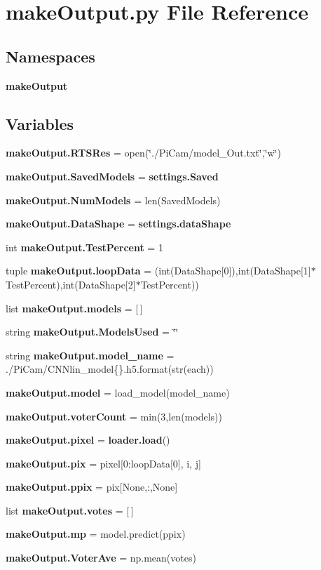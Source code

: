 \section{make\+Output.\+py File Reference}
\label{make_output_8py}
\subsection*{Namespaces}
\begin{DoxyCompactItemize}
\item 
 \textbf{ make\+Output}
\end{DoxyCompactItemize}
\subsection*{Variables}
\begin{DoxyCompactItemize}
\item 
\textbf{ make\+Output.\+R\+T\+S\+Res} = open(\char`\"{}./Pi\+Cam/model\+\_\+\+Out.\+txt\char`\"{},\char`\"{}w\char`\"{})
\item 
\textbf{ make\+Output.\+Saved\+Models} = \textbf{ settings.\+Saved}
\item 
\textbf{ make\+Output.\+Num\+Models} = len(Saved\+Models)
\item 
\textbf{ make\+Output.\+Data\+Shape} = \textbf{ settings.\+data\+Shape}
\item 
int \textbf{ make\+Output.\+Test\+Percent} = 1
\item 
tuple \textbf{ make\+Output.\+loop\+Data} = (int(Data\+Shape[0]),int(Data\+Shape[1]$\ast$Test\+Percent),int(Data\+Shape[2]$\ast$Test\+Percent))
\item 
list \textbf{ make\+Output.\+models} = [$\,$]
\item 
string \textbf{ make\+Output.\+Models\+Used} = \char`\"{}\char`\"{}
\item 
string \textbf{ make\+Output.\+model\+\_\+name} = \textquotesingle{}./Pi\+Cam/C\+N\+Nlin\+\_\+model\{\}.h5\textquotesingle{}.format(str(each))
\item 
\textbf{ make\+Output.\+model} = load\+\_\+model(model\+\_\+name)
\item 
\textbf{ make\+Output.\+voter\+Count} = min(3,len(models))
\item 
\textbf{ make\+Output.\+pixel} = \textbf{ loader.\+load}()
\item 
\textbf{ make\+Output.\+pix} = pixel[0\+:loop\+Data[0], i, j]
\item 
\textbf{ make\+Output.\+ppix} = pix[None,\+:,None]
\item 
list \textbf{ make\+Output.\+votes} = [$\,$]
\item 
\textbf{ make\+Output.\+mp} = model.\+predict(ppix)
\item 
\textbf{ make\+Output.\+Voter\+Ave} = np.\+mean(votes)
\end{DoxyCompactItemize}
